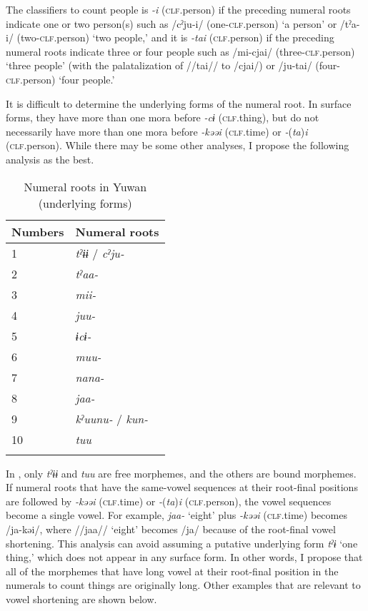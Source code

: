   The classifiers to count people is \textit{{}-i} (\textsc{clf}.person) if the preceding numeral roots indicate one or two person(s) such as /cˀju-i/ (one-\textsc{clf}.person) ‘a person’ or /tˀa-i/ (two-\textsc{clf}.person) ‘two people,’ and it is \textit{{}-tai} (\textsc{clf}.person) if the preceding numeral roots indicate three or four people such as /mi-cjai/ (three-\textsc{clf}.person) ‘three people’ (with the palatalization of //tai// to /cjai/) or /ju-tai/ (four-\textsc{clf}.person) ‘four people.’

  It is difficult to determine the underlying forms of the numeral root. In surface forms, they have more than one mora before \textit{{}-cɨ} (\textsc{clf}.thing), but do not necessarily have more than one mora before \textit{{}-kəəi} (\textsc{clf}.time) or \textit{{}-}(\textit{ta})\textit{i} (\textsc{clf}.person). While there may be some other analyses, I propose the following analysis as the best.

\begin{table}
\caption{\label{tab:key:51} Numeral roots in Yuwan (underlying forms)}
\begin{tabular}{ll}
\lsptoprule
Numbers & Numeral roots\\
\midrule
1  &\textit{tˀɨɨ} / \textit{cˀju-}      \\
2  &\textit{tˀaa-}                      \\
3  &\textit{mii-}                       \\
4  &\textit{juu-}                       \\
5  &\textit{ɨcɨ-}                       \\
6  &\textit{muu-}                       \\
7  &\textit{nana-}                      \\
8  &\textit{jaa-}                       \\
9  &\textit{kˀuunu-} / \textit{kun-}    \\
10 & \textit{tuu}                         \\
\lspbottomrule
\end{tabular}
\end{table}

{In , only} {\textit{tˀɨɨ} and} {\textit{tuu} are free morphemes, and the others are bound morphemes. If numeral roots that have the same-vowel sequences at their root-final positions are followed by} {\textit{{}-kəəi} (\textsc{clf}.time) or} {\textit{{}-}}{(}{\textit{ta}}{)}{\textit{i} }{(\textsc{clf}.person), the vowel sequences become a single vowel. For example,} {\textit{jaa-} ‘eight’ plus} {\textit{{}-kəəi} (\textsc{clf}.time) becomes /ja-kəi/, where //jaa// ‘eight’ becomes /ja/ because of the root-final vowel shortening. This analysis} {can avoid assuming a putative underlying form} {\textit{tˀɨ} ‘one thing,’ which does not appear in any surface form. In other words, I propose that all of the morphemes that have long vowel at their root-final position in the numerals to count things are originally long. Other examples that are relevant to vowel shortening are shown below.}

